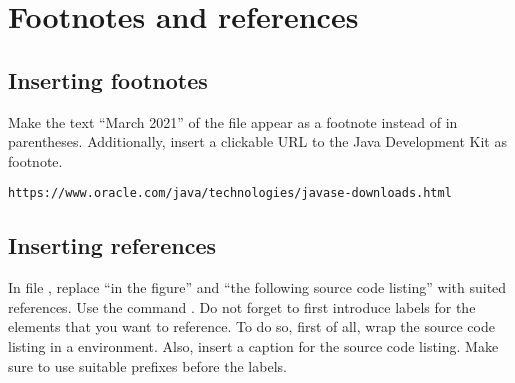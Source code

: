 \section{Footnotes and references}

\subsection{Inserting footnotes}

Make the text \enquote{March 2021} of the file 
 appear as a footnote instead of in 
parentheses. Additionally, insert a clickable URL to the Java Development Kit 
as footnote.

\texttt{https://www.oracle.com/java/technologies/javase-downloads.html}



\subsection{Inserting references}

In file , replace \enquote{in the 
figure} and \enquote{the following source code listing} with suited references. 
Use the command . Do not forget to first 
introduce labels for the elements that you want to reference. To do so, first 
of all, wrap the source code listing in a  environment.
Also, insert a caption for the source code listing. 
Make sure to use suitable prefixes before the labels.

